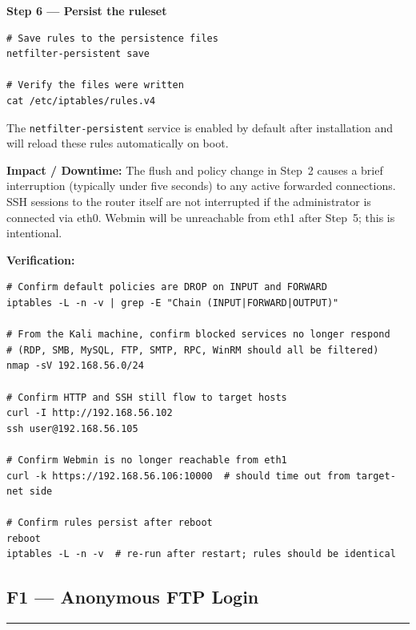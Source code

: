 \documentclass[12pt]{article}
\newcommand{\sectionrule}{%
  \vspace{4pt}\noindent\textcolor{headercol}{\rule{\linewidth}{0.8pt}}\vspace{4pt}%
}
\begin{document}
\bigskip
\noindent\textbf{Step 6 --- Persist the ruleset}
 
\begin{lstlisting}[style=terminal]
# Save rules to the persistence files
netfilter-persistent save
 
# Verify the files were written
cat /etc/iptables/rules.v4
\end{lstlisting}
 
The \texttt{netfilter-persistent} service is enabled by default after
installation and will reload these rules automatically on boot.
 
\bigskip
 
\begin{impactbox}
\textbf{Impact / Downtime:} The flush and policy change in Step~2 causes a
brief interruption (typically under five seconds) to any active forwarded
connections. SSH sessions to the router itself are not interrupted if the
administrator is connected via eth0. Webmin will be unreachable from eth1
after Step~5; this is intentional.
\end{impactbox}
 
\bigskip
 
\begin{verifybox}
\textbf{Verification:}
\begin{lstlisting}[style=terminal]
# Confirm default policies are DROP on INPUT and FORWARD
iptables -L -n -v | grep -E "Chain (INPUT|FORWARD|OUTPUT)"
 
# From the Kali machine, confirm blocked services no longer respond
# (RDP, SMB, MySQL, FTP, SMTP, RPC, WinRM should all be filtered)
nmap -sV 192.168.56.0/24
 
# Confirm HTTP and SSH still flow to target hosts
curl -I http://192.168.56.102
ssh user@192.168.56.105
 
# Confirm Webmin is no longer reachable from eth1
curl -k https://192.168.56.106:10000  # should time out from target-net side
 
# Confirm rules persist after reboot
reboot
iptables -L -n -v  # re-run after restart; rules should be identical
\end{lstlisting}
\end{verifybox}
 
\subsection{F1 --- Anonymous FTP Login}
\sectionrule
 
\end{document}
